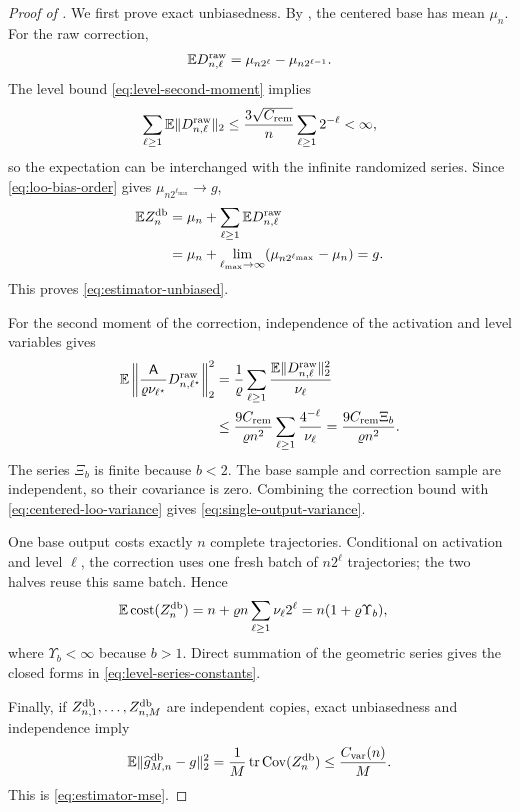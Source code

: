\begin{proof}[Proof of ]
We first prove exact unbiasedness.  By , the centered base has mean $\mu_n$.  For the raw correction,
\begin{equation}\label{eq:delta-mean}
 \mathbb E D_{n,\ell}^{\rm raw}
 =\mu_{n2^\ell}-\mu_{n2^{\ell-1}}.
\end{equation}
The level bound \eqref{eq:level-second-moment} implies
\[
 \sum_{\ell\ge1}\mathbb E\lVert D_{n,\ell}^{\rm raw}\rVert_2
 \le\frac{3\sqrt{C_{\rm rem}}}{n}\sum_{\ell\ge1}2^{-\ell}<\infty,
\]
so the expectation can be interchanged with the infinite randomized series.  Since \eqref{eq:loo-bias-order} gives $\mu_{n2^{\ell_{\max}}}\to g$,
\begin{align*}
 \mathbb E Z_n^{\mathrm{db}}
 &=\mu_n+\sum_{\ell\ge1}\mathbb E D_{n,\ell}^{\rm raw}\\
 &=\mu_n+\lim_{\ell_{\max}\to\infty}(\mu_{n2^{\ell_{\max}}}-\mu_n)
 =g.
\end{align*}
This proves \eqref{eq:estimator-unbiased}.

For the second moment of the correction, independence of the activation and level variables gives
\begin{align*}
 \mathbb E\left\|\frac{\mathsf A}{\varrho\nu_{\ell^\star}}D_{n,\ell^\star}^{\rm raw}\right\|_2^2
 &=\frac1\varrho\sum_{\ell\ge1}
 \frac{\mathbb E\lVert D_{n,\ell}^{\rm raw}\rVert_2^2}{\nu_\ell}\\
 &\le\frac{9C_{\rm rem}}{\varrho n^2}
 \sum_{\ell\ge1}\frac{4^{-\ell}}{\nu_\ell}
 =\frac{9C_{\rm rem}\Xi_b}{\varrho n^2}.
\end{align*}
The series $\Xi_b$ is finite because $b<2$.  The base sample and correction sample are independent, so their covariance is zero.  Combining the correction bound with \eqref{eq:centered-loo-variance} gives \eqref{eq:single-output-variance}.

One base output costs exactly $n$ complete trajectories.  Conditional on activation and level $\ell$, the correction uses one fresh batch of $n2^\ell$ trajectories; the two halves reuse this same batch.  Hence
\begin{align*}
 \mathbb E\operatorname{cost}(Z_n^{\mathrm{db}})
 &=n+\varrho n\sum_{\ell\ge1}\nu_\ell2^\ell
 =n(1+\varrho \Upsilon_b),
\end{align*}
where $\Upsilon_b<\infty$ because $b>1$.  Direct summation of the geometric series gives the closed forms in \eqref{eq:level-series-constants}.

Finally, if $Z_{n,1}^{\mathrm{db}},\ldots,Z_{n,M}^{\mathrm{db}}$ are independent copies, exact unbiasedness and independence imply
\[
 \mathbb E\lVert\widehat g_{M,n}^{\mathrm{db}}-g\rVert_2^2
 =\frac1M\operatorname{tr}\operatorname{Cov}(Z_n^{\mathrm{db}})
 \le\frac{C_{\rm var}(n)}{M}.
\]
This is \eqref{eq:estimator-mse}.
\end{proof}

